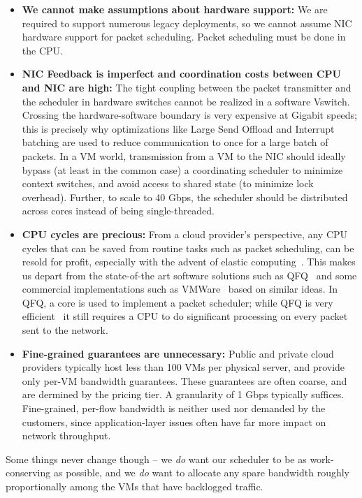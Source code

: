 \begin{itemize}
\item {\bf We cannot make assumptions about hardware support:} We are required to support
numerous legacy deployments, so we cannot assume NIC hardware support for
packet scheduling. Packet scheduling must be done in the CPU.

\item {\bf NIC Feedback is imperfect and coordination costs between CPU and NIC are
high:} The tight coupling between the packet transmitter and the scheduler in hardware
switches cannot be realized in a software Vswitch.  Crossing the hardware-software boundary
is very expensive at Gigabit speeds; this is precisely why optimizations
like Large Send Offload and Interrupt batching are used to reduce communication to once for
a large batch of packets.  In a VM world, transmission from a VM to the NIC
should ideally bypass (at least in the common case) a coordinating scheduler to
minimize context switches, and avoid access to shared state (to minimize lock
overhead).  Further, to scale to 40 Gbps, the scheduler should be distributed
across cores instead of being single-threaded. 

\item {\bf CPU cycles are precious:} From a cloud provider's perspective, any
CPU cycles that can be saved from routine tasks such as packet scheduling, can
be resold for profit, especially with the advent of elastic
computing~\cite{aws}.  This makes us depart from the state-of-the art software
solutions such as QFQ~\cite{qfq} and some commercial implementations such as
VMWare~\cite{} based on similar ideas.  In QFQ, a core is used to implement a
packet scheduler; while QFQ is very efficient~\cite{qfq} it still requires a CPU
to do significant processing on every packet sent to the network.

\item {\bf Fine-grained guarantees are unnecessary:} Public and private cloud providers typically host 
less than 100 VMs per physical server, and provide only per-VM bandwidth guarantees.  These
guarantees are often coarse, and are dermined by the pricing tier.  A granularity
of 1 Gbps typically suffices.  Fine-grained, per-flow bandwidth is neither
used nor demanded by the customers, since application-layer issues often have
far more impact on network throughput.
\end{itemize}

Some things never change though -- we {\em do} want our scheduler to be as
work-conserving as possible, and we {\em do} want to allocate any spare
bandwidth roughly proportionally among the VMs that have backlogged traffic. 

